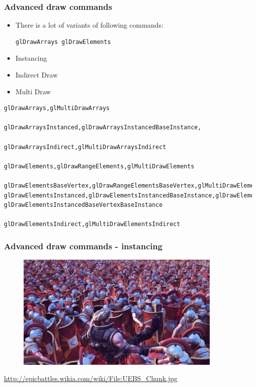 
\begin{frame}[fragile]
\frametitle{Advanced draw commands}
	\begin{itemize}
	\item There is a lot of variants of following commands:
\begin{verbatim}
glDrawArrays glDrawElements
\end{verbatim}
	\item Instancing
	\item Indirect Draw
  \item Multi Draw
	\end{itemize}
{\tiny
\begin{verbatim}
glDrawArrays,glMultiDrawArrays

glDrawArraysInstanced,glDrawArraysInstancedBaseInstance,

glDrawArraysIndirect,glMultiDrawArraysIndirect

glDrawElements,glDrawRangeElements,glMultiDrawElements

glDrawElementsBaseVertex,glDrawRangeElementsBaseVertex,glMultiDrawElementsBaseVertex
glDrawElementsInstanced,glDrawElementsInstancedBaseInstance,glDrawElementsInstancedBaseVertex, 
glDrawElementsInstancedBaseVertexBaseInstance

glDrawElementsIndirect,glMultiDrawElementsIndirect
\end{verbatim}
}
\end{frame}

\begin{frame}[fragile]
\frametitle{Advanced draw commands - instancing}
	\begin{figure}[h]
	\includegraphics[width=10cm,keepaspectratio]{pics/uebs_instancing.jpg}
	\end{figure}
\url{http://epicbattles.wikia.com/wiki/File:UEBS_Chunk.jpg}
\end{frame}

